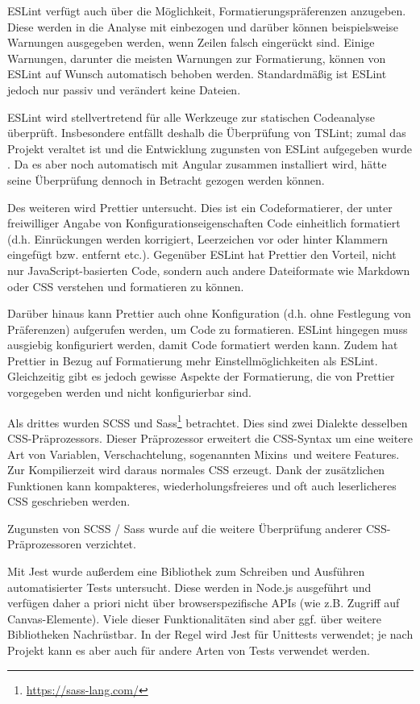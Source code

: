 ESLint verfügt auch über die Möglichkeit, Formatierungspräferenzen anzugeben. Diese werden in die Analyse mit einbezogen und darüber können beispielsweise Warnungen ausgegeben werden, wenn Zeilen falsch eingerückt sind. Einige Warnungen, darunter die meisten Warnungen zur Formatierung, können von ESLint auf Wunsch automatisch behoben werden. Standardmäßig ist ESLint jedoch nur passiv und verändert keine Dateien.

ESLint wird stellvertretend für alle Werkzeuge zur statischen Codeanalyse überprüft. Insbesondere entfällt deshalb die Überprüfung von TSLint; zumal das Projekt veraltet ist und die Entwicklung zugunsten von ESLint aufgegeben wurde \cite{tslint_deprecation} \cite{tslint_repo}. Da es aber noch automatisch mit Angular zusammen installiert wird, hätte seine Überprüfung dennoch in Betracht gezogen werden können.

Des weiteren wird Prettier untersucht. Dies ist ein Codeformatierer, der unter freiwilliger Angabe von Konfigurationseigenschaften Code einheitlich formatiert (d.h. Einrückungen werden korrigiert, Leerzeichen vor oder hinter Klammern eingefügt bzw. entfernt etc.). Gegenüber ESLint hat Prettier den Vorteil, nicht nur JavaScript-basierten Code, sondern auch andere Dateiformate wie Markdown oder CSS verstehen und formatieren zu können.

Darüber hinaus kann Prettier auch ohne Konfiguration (d.h. ohne Festlegung von Präferenzen) aufgerufen werden, um Code zu formatieren. ESLint hingegen muss ausgiebig konfiguriert werden, damit Code formatiert werden kann. Zudem hat Prettier in Bezug auf Formatierung mehr Einstellmöglichkeiten als ESLint. Gleichzeitig gibt es jedoch gewisse Aspekte der Formatierung, die von Prettier vorgegeben werden und nicht konfigurierbar sind.

Als drittes wurden SCSS und Sass\footnote{\url{https://sass-lang.com/}} betrachtet. Dies sind zwei Dialekte desselben CSS-Präprozessors. Dieser Präprozessor erweitert die CSS-Syntax um eine weitere Art von Variablen, Verschachtelung, sogenannten \glqq Mixins\grqq\ und weitere Features. Zur Kompilierzeit wird daraus normales CSS erzeugt. Dank der zusätzlichen Funktionen kann kompakteres, wiederholungsfreieres und oft auch leserlicheres CSS geschrieben werden.

Zugunsten von SCSS / Sass wurde auf die weitere Überprüfung anderer CSS-Präprozessoren verzichtet.

\label{konz:jest_explanation}
Mit Jest wurde außerdem eine Bibliothek zum Schreiben und Ausführen automatisierter Tests untersucht. Diese werden in Node.js ausgeführt und verfügen daher a priori nicht über browserspezifische APIs (wie z.B. Zugriff auf Canvas-Elemente). Viele dieser Funktionalitäten sind aber ggf. über weitere Bibliotheken Nachrüstbar. In der Regel wird Jest für Unittests verwendet; je nach Projekt kann es aber auch für andere Arten von Tests verwendet werden.


